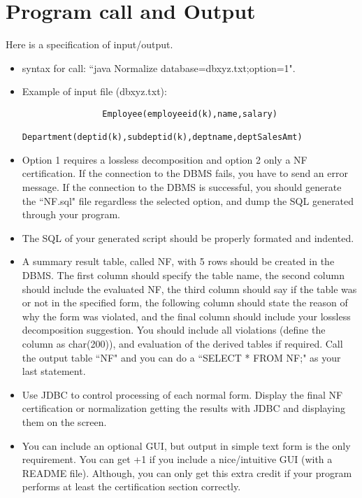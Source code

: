\section{Program call and Output}
Here is a specification of input/output.
\begin{itemize}
	\item syntax for call: ``java Normalize database=dbxyz.txt;option=1".
	\item Example of input file (dbxyz.txt):
				\begin{verbatim}
				Employee(employeeid(k),name,salary)
				Department(deptid(k),subdeptid(k),deptname,deptSalesAmt)
				\end{verbatim}
	\item Option 1 requires a lossless decomposition and option 2 only a NF certification. 
	If the connection to the DBMS fails, you have to send an error message.
	If the connection to the DBMS is successful, you should generate the ``NF.sql" file regardless the selected option, and dump the SQL generated through your program.
	\item The SQL of your generated script should be properly formated and indented.
	\item A summary result table, called NF, with 5 rows should be created in the DBMS. The first column should specify the table name, the second column should include the evaluated NF, the third column should say if the table was or not in the specified form, the following column should state the reason of why the form was violated, and the final column should include your lossless decomposition suggestion. You should include all violations (define the column as char(200)), and evaluation of the derived tables if required. Call the output
table ``NF" and you can do a ``SELECT * FROM NF;" as your last statement.
	\item Use JDBC to control processing of each normal form. %
Display the final NF certification or normalization getting the results with JDBC and displaying them on the screen.
	\item You can include an optional GUI, but output in simple text form is the only requirement. You can get +1 if you include a nice/intuitive GUI (with a README file). Although, you can only get this extra credit if your program performs at least the certification section correctly.
\end{itemize}


